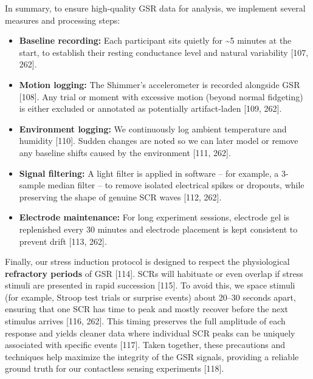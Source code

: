 \documentclass{article}
\begin{document}
    In summary, to ensure high-quality GSR data for analysis, we implement several measures and processing steps:
    \begin{itemize}
        \item \textbf{Baseline recording:} Each participant sits quietly for \textasciitilde5 minutes at the start, to establish their resting conductance level and natural variability [107, 262].
        \item \textbf{Motion logging:} The Shimmer’s accelerometer is recorded alongside GSR [108]. Any trial or moment with excessive motion (beyond normal fidgeting) is either excluded or annotated as potentially artifact-laden [109, 262].
        \item \textbf{Environment logging:} We continuously log ambient temperature and humidity [110]. Sudden changes are noted so we can later model or remove any baseline shifts caused by the environment [111, 262].
        \item \textbf{Signal filtering:} A light filter is applied in software – for example, a 3-sample median filter – to remove isolated electrical spikes or dropouts, while preserving the shape of genuine SCR waves [112, 262].
        \item \textbf{Electrode maintenance:} For long experiment sessions, electrode gel is replenished every 30 minutes and electrode placement is kept consistent to prevent drift [113, 262].
    \end{itemize}

    Finally, our stress induction protocol is designed to respect the physiological \textbf{refractory periods} of GSR [114]. SCRs will habituate or even overlap if stress stimuli are presented in rapid succession [115]. To avoid this, we space stimuli (for example, Stroop test trials or surprise events) about 20–30 seconds apart, ensuring that one SCR has time to peak and mostly recover before the next stimulus arrives [116, 262]. This timing preserves the full amplitude of each response and yields cleaner data where individual SCR peaks can be uniquely associated with specific events [117]. Taken together, these precautions and techniques help maximize the integrity of the GSR signals, providing a reliable ground truth for our contactless sensing experiments [118].
\end{document}
